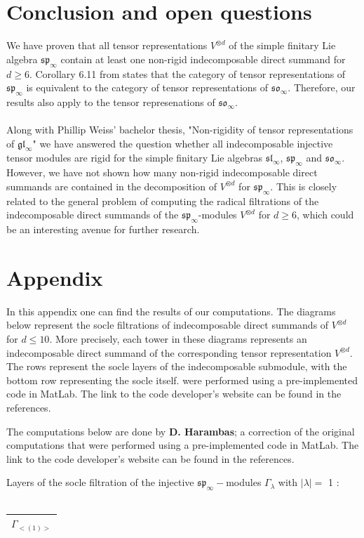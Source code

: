 \section{Conclusion and open questions}
We have proven that all tensor representations $V^{\otimes d}$ of the simple finitary Lie algebra $\mathfrak{sp}_{\infty}$ contain at least one non-rigid indecomposable direct summand for $d\ge6$. Corollary 6.11 from \cite{cohen} states that the category of  tensor representations of $\mathfrak{sp}_{\infty}$  is equivalent to the category of tensor representations of $\mathfrak{so}_{\infty}$. Therefore, our results also apply to the tensor represenations of $\mathfrak{so}_{\infty}$. 
\\\\Along with Phillip Weiss' bachelor thesis, "Non-rigidity of tensor representations of $\mathfrak{gl}_{\infty}$" we have answered the question whether all indecomposable injective tensor modules are rigid for the simple finitary Lie algebras $\mathfrak{sl}_{\infty}$, $\mathfrak{sp}_{\infty}$ and $\mathfrak{so}_{\infty}$. However, we have not shown how many non-rigid indecomposable direct summands are contained in the decomposition of $V^{\otimes d}$ for $\mathfrak{sp}_{\infty}$. This is closely related to the general problem of computing the radical filtrations of the indecomposable direct summands of the $\mathfrak{sp}_{\infty}$-modules $V^{\otimes d}$ for $d\geq 6$, which could be an interesting avenue for further research.
\section{Appendix}
In this appendix one can find the results of our computations. The diagrams below represent the socle filtrations of indecomposable direct summands of $V^{\otimes d}$ for $d\leq10$. More precisely, each tower in these diagrams represents an indecomposable direct summand
of the corresponding tensor representation $V^{\otimes d}.$ The rows represent the socle
layers of the indecomposable submodule, with the bottom row representing the socle itself.
were performed using a pre-implemented code in MatLab. The link \cite{url} to the code developer's website can be found in the references.
\par
The computations below are done by \textbf{D. Harambas}; a correction of the original computations that were performed using a pre-implemented code in MatLab. The link \cite{url} to the code developer's website can be found in the references.
\par
Layers of the socle filtration of the injective $\mathfrak{sp}_\infty-$modules $\Gamma_{\lambda}$ with $|\lambda| = $ 1 : \\\\
\begin{minipage}{1\textwidth}
\centering
\begin{tabular}{|c|}\hline
$\Gamma_{<(
1
)>}$
\\
\hline\end{tabular}\end{minipage}
\\



